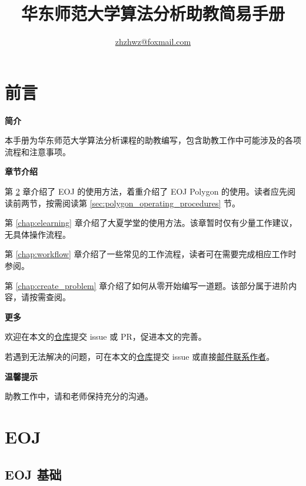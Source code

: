\documentclass[oneside]{book}
\title{华东师范大学算法分析助教简易手册}
\author{\href{mailto:zhzhwz@foxmail.com}{zhzhwz@foxmail.com}}
\begin{document}
\frontmatter

\maketitle

\chapter{前言}

\noindent \textbf{简介}

本手册为华东师范大学算法分析课程的助教编写，包含助教工作中可能涉及的各项流程和注意事项。

\bigbreak

\noindent \textbf{章节介绍}

第 \ref{chap:eoj} 章介绍了 EOJ 的使用方法，着重介绍了 EOJ Polygon 的使用。读者应先阅读前两节，按需阅读第 \ref{sec:polygon_operating_procedures} 节。

第 \ref{chap:elearning} 章介绍了大夏学堂的使用方法。该章暂时仅有少量工作建议，无具体操作流程。

第 \ref{chap:workflow} 章介绍了一些常见的工作流程，读者可在需要完成相应工作时参阅。

第 \ref{chap:create_problem} 章介绍了如何从零开始编写一道题。该部分属于进阶内容，请按需查阅。

\bigbreak

\noindent \textbf{更多}

欢迎在本文的\href{https://github.com/zhzhwz/ECNUAlgorithmTAManual}{仓库}提交 issue 或 PR，促进本文的完善。

若遇到无法解决的问题，可在本文的\href{https://github.com/zhzhwz/ECNUAlgorithmTAManual}{仓库}提交 issue 或直接\href{mailto:zhzhwz@foxmail.com}{邮件联系作者}。 

\bigbreak

\noindent \textbf{温馨提示}

助教工作中，请和老师保持充分的沟通。

\tableofcontents

\mainmatter

\chapter{EOJ}

\label{chap:eoj}

\section{EOJ 基础}
\end{document}
